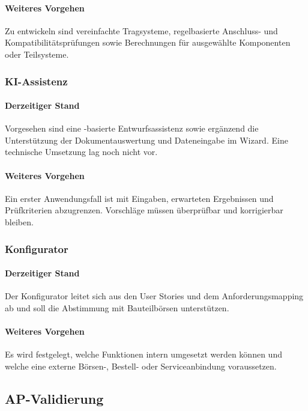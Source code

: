 \documentclass[type=zwischenbericht]{zukunftbau}
\begin{document}
\paragraph{Weiteres Vorgehen}
Zu entwickeln sind vereinfachte Tragsysteme, regelbasierte Anschluss- und Kompatibilitätsprüfungen sowie Berechnungen für ausgewählte Komponenten oder Teilsysteme.

\subsubsection{KI-Assistenz}

\paragraph{Derzeitiger Stand}
Vorgesehen sind eine -basierte Entwurfsassistenz sowie ergänzend die Unterstützung der Dokumentauswertung und Dateneingabe im Wizard. Eine technische Umsetzung lag noch nicht vor.

\paragraph{Weiteres Vorgehen}
Ein erster Anwendungsfall ist mit Eingaben, erwarteten Ergebnissen und Prüfkriterien abzugrenzen. Vorschläge müssen überprüfbar und korrigierbar bleiben.

\subsubsection{Konfigurator}

\paragraph{Derzeitiger Stand}
Der Konfigurator leitet sich aus den User Stories und dem Anforderungsmapping ab und soll die Abstimmung mit Bauteilbörsen unterstützen.

\paragraph{Weiteres Vorgehen}
Es wird festgelegt, welche Funktionen intern umgesetzt werden können und welche eine externe Börsen-, Bestell- oder Serviceanbindung voraussetzen.

\subsection{AP-Validierung}
\end{document}
